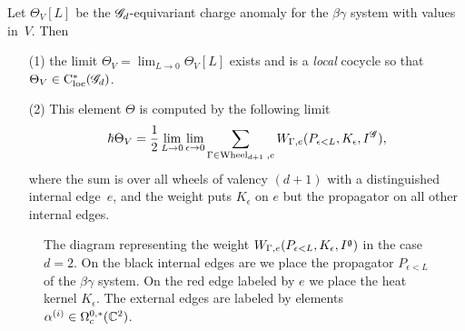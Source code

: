 \begin{lem}\label{lem: obs}
Let $\Theta_V[L]$ be the $\mathscr G_d$-equivariant charge anomaly for the $\beta\gamma$ system with values in~$V$.
Then 
\begin{itemize}
\item[(1)] the limit $\Theta_V = \lim_{L \to 0} \Theta_V[L]$ exists and is a {\em local} cocycle so that $\Theta_V \in {\rm C}_{\rm loc}^*(\mathscr G_d)$.
\item[(2)] This element $\Theta$ is computed by the following limit
\[
\hbar \Theta_V = \frac{1}{2} \lim_{L \to 0} \lim_{\epsilon \to 0} \sum_{\Gamma \in {\rm Wheel}_{d+1} \; , e} W_{\Gamma, e}(P_{\epsilon <L}, K_\epsilon, I^{\mathscr G}) ,
\] 
where the sum is over all wheels of valency $(d+1)$ with a distinguished internal edge~$e$, and the weight puts $K_\epsilon$ on $e$ but the propagator on all other internal edges. 
\end{itemize}
\end{lem}

\begin{figure}
\begin{center}
\caption{The diagram representing the weight $W_{\Gamma, e}(P_{\epsilon<L}, K_\epsilon, I^\mathfrak g)$ in the case $d=2$. 
On the black internal edges are we place the propagator $P_{\epsilon < L}$ of the $\beta\gamma$ system. 
On the red edge labeled by $e$ we place the heat kernel $K_\epsilon$.
The external edges are labeled by elements $\alpha^{(i)} \in \Omega^{0,*}_c(\mathbb C^2)$.}
\label{fig:liewheel}
\end{center}
\end{figure}

